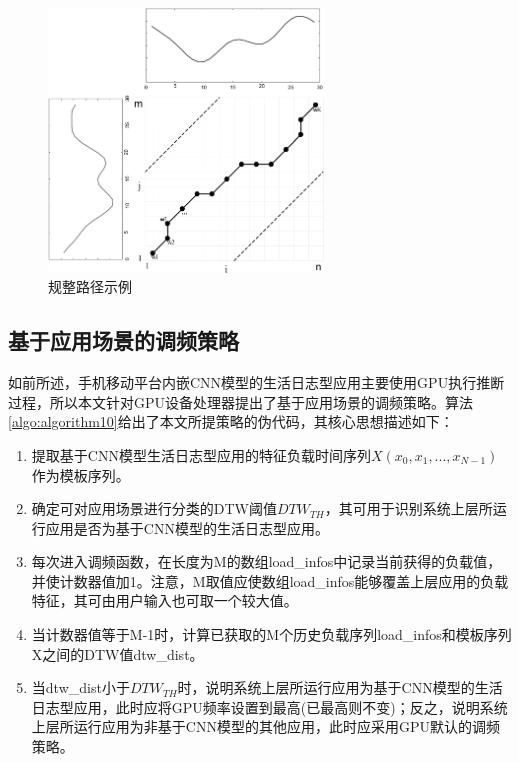 \begin{figure}[htbp]
    \centering
    \includegraphics[height=0.56\textwidth, width=0.65\textwidth]{figures/dtw_dist.pdf}
    \caption{规整路径示例 \cite{keogh2001derivative}}\label{figure:figure40}
\end{figure}

\subsection{基于应用场景的调频策略}

如前所述，手机移动平台内嵌CNN模型的生活日志型应用主要使用GPU执行推断过程，所以本文针对GPU设备处理器提出了基于应用场景的调频策略。算法\ref{algo:algorithm10}给出了本文所提策略的伪代码，其核心思想描述如下：
\begin{enumerate}
  \item 提取基于CNN模型生活日志型应用的特征负载时间序列$X(x_0, x_1, ... , x_ {N-1})$作为模板序列。
  \item 确定可对应用场景进行分类的DTW阈值$DTW_{TH}$，其可用于识别系统上层所运行应用是否为基于CNN模型的生活日志型应用。
  \item 每次进入调频函数，在长度为M的数组load\_infos中记录当前获得的负载值，并使计数器值加1。注意，M取值应使数组load\_infos能够覆盖上层应用的负载特征，其可由用户输入也可取一个较大值。
  \item 当计数器值等于M-1时，计算已获取的M个历史负载序列load\_infos和模板序列X之间的DTW值dtw\_dist。
  \item 当dtw\_dist小于$DTW_{TH}$时，说明系统上层所运行应用为基于CNN模型的生活日志型应用，此时应将GPU频率设置到最高(已最高则不变)；反之，说明系统上层所运行应用为非基于CNN模型的其他应用，此时应采用GPU默认的调频策略。
\end{enumerate}

